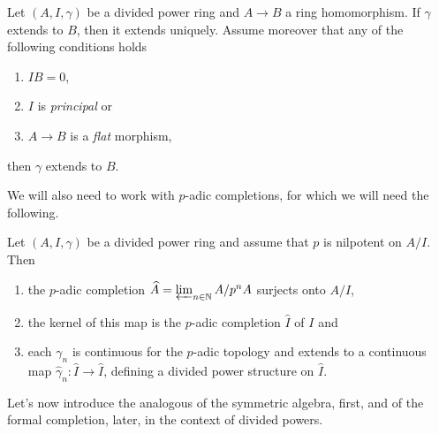 \newpage
\begin{lem}
\label{lem:PDFlatExtension}
	Let $\left(A, I, \gamma\right)$ be a divided power ring
	and $A \to B$ a ring homomorphism.
	If $\gamma$ extends to $B$, then it extends uniquely.
	Assume moreover that any of the following conditions holds
\begin{enumerate}
	\item $IB = 0$,
	\item $I$ is \emph{principal} or
	\item $A \to B$ is a \emph{flat} morphism,
\end{enumerate}
	then $\gamma$ extends to $B$.
\end{lem} 


\noindent
We will also need to work with $p$-adic completions, 
for which we will need the following.
\begin{lem}
	\label{PDExtendCompletion}
	Let $\left(A, I, \gamma\right)$ be a divided power ring and assume
	that $p$ is nilpotent on $A/I$.
	Then
\begin{enumerate}
	\item the $p$-adic completion $\widehat{A} = \varprojlim_{n \in \mathbb{N}}
		A/p^nA$ surjects onto $A/I$,
	\item the kernel of this map is the $p$-adic completion $\widehat{I}$
		of $I$ and
	\item each $\gamma_n$ is continuous for the $p$-adic topology and extends
		to a continuous map $\widehat{\gamma}_n\colon \widehat{I} \to \widehat{I}$,
		defining a divided power structure on $\widehat{I}$.
\end{enumerate}
\end{lem} 


\noindent
Let's now introduce the analogous of the symmetric algebra, first,
and of the formal completion, later,
in the context of divided powers.


